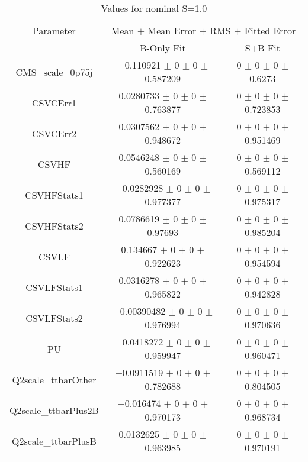 \begin{table}
\centering
\caption{Values for nominal S=1.0}
\begin{tabular}{ccc}
\toprule
Parameter & \multicolumn{2}{c}{Mean $\pm$ Mean Error $\pm$ RMS $\pm$ Fitted Error}\\
 & B-Only Fit & S+B Fit\\
\midrule
CMS\_scale\_0p75j & \num{-0.110921} $\pm$ \num{0} $\pm$ \num{0} $\pm$ \num{0.587209} & \num{0} $\pm$ \num{0} $\pm$ \num{0} $\pm$ \num{0.6273}\\
CSVCErr1 & \num{0.0280733} $\pm$ \num{0} $\pm$ \num{0} $\pm$ \num{0.763877} & \num{0} $\pm$ \num{0} $\pm$ \num{0} $\pm$ \num{0.723853}\\
CSVCErr2 & \num{0.0307562} $\pm$ \num{0} $\pm$ \num{0} $\pm$ \num{0.948672} & \num{0} $\pm$ \num{0} $\pm$ \num{0} $\pm$ \num{0.951469}\\
CSVHF & \num{0.0546248} $\pm$ \num{0} $\pm$ \num{0} $\pm$ \num{0.560169} & \num{0} $\pm$ \num{0} $\pm$ \num{0} $\pm$ \num{0.569112}\\
CSVHFStats1 & \num{-0.0282928} $\pm$ \num{0} $\pm$ \num{0} $\pm$ \num{0.977377} & \num{0} $\pm$ \num{0} $\pm$ \num{0} $\pm$ \num{0.975317}\\
CSVHFStats2 & \num{0.0786619} $\pm$ \num{0} $\pm$ \num{0} $\pm$ \num{0.97693} & \num{0} $\pm$ \num{0} $\pm$ \num{0} $\pm$ \num{0.985204}\\
CSVLF & \num{0.134667} $\pm$ \num{0} $\pm$ \num{0} $\pm$ \num{0.922623} & \num{0} $\pm$ \num{0} $\pm$ \num{0} $\pm$ \num{0.954594}\\
CSVLFStats1 & \num{0.0316278} $\pm$ \num{0} $\pm$ \num{0} $\pm$ \num{0.965822} & \num{0} $\pm$ \num{0} $\pm$ \num{0} $\pm$ \num{0.942828}\\
CSVLFStats2 & \num{-0.00390482} $\pm$ \num{0} $\pm$ \num{0} $\pm$ \num{0.976994} & \num{0} $\pm$ \num{0} $\pm$ \num{0} $\pm$ \num{0.970636}\\
PU & \num{-0.0418272} $\pm$ \num{0} $\pm$ \num{0} $\pm$ \num{0.959947} & \num{0} $\pm$ \num{0} $\pm$ \num{0} $\pm$ \num{0.960471}\\
Q2scale\_ttbarOther & \num{-0.0911519} $\pm$ \num{0} $\pm$ \num{0} $\pm$ \num{0.782688} & \num{0} $\pm$ \num{0} $\pm$ \num{0} $\pm$ \num{0.804505}\\
Q2scale\_ttbarPlus2B & \num{-0.016474} $\pm$ \num{0} $\pm$ \num{0} $\pm$ \num{0.970173} & \num{0} $\pm$ \num{0} $\pm$ \num{0} $\pm$ \num{0.968734}\\
Q2scale\_ttbarPlusB & \num{0.0132625} $\pm$ \num{0} $\pm$ \num{0} $\pm$ \num{0.963985} & \num{0} $\pm$ \num{0} $\pm$ \num{0} $\pm$ \num{0.970191}\\

\end{tabular}
\end{table}
